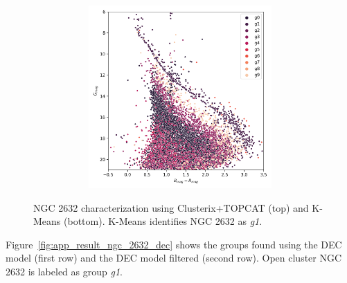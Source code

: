 \documentclass[11pt,a4paper,english,twocolumn]{article}
\begin{document}
\begin{figure}[htbp]
\begin{subfigure}{\columnwidth}
\begin{subfigure}[t]{0.30\textwidth}
    \end{subfigure}
    \hfill
    \begin{subfigure}[t]{0.30\textwidth}
      \centering
      \includegraphics[width=\textwidth]{../figures/ngc_2632/kmeans_hr_diagram_ngc_2632.png}
    \end{subfigure}
  \end{subfigure}
  \caption{NGC 2632 characterization using Clusterix+TOPCAT (top) and K-Means (bottom).
           K-Means identifies NGC 2632 as \emph{g1}.}
  \label{fig:app_result_ngc_2632_clusterix_kmeans}
\end{figure}

Figure~\ref{fig:app_result_ngc_2632_dec} shows the groups found using
the DEC model (first row) and the DEC model filtered (second row).
Open cluster NGC 2632 is labeled as group \emph{g1}.
\end{document}
